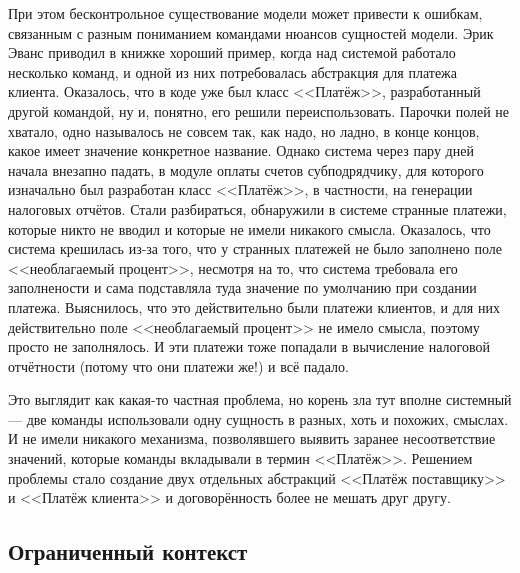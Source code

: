\documentclass{../../text-style}
\begin{document}
При этом бесконтрольное существование модели может привести к ошибкам, связанным с разным пониманием командами нюансов сущностей модели. Эрик Эванс приводил в книжке хороший пример, когда над системой работало несколько команд, и одной из них потребовалась абстракция для платежа клиента. Оказалось, что в коде уже был класс <<Платёж>>, разработанный другой командой, ну и, понятно, его решили переиспользовать. Парочки полей не хватало, одно называлось не совсем так, как надо, но ладно, в конце концов, какое имеет значение конкретное название. Однако система через пару дней начала внезапно падать, в модуле оплаты счетов субподрядчику, для которого изначально был разработан класс <<Платёж>>, в частности, на генерации налоговых отчётов. Стали разбираться, обнаружили в системе странные платежи, которые никто не вводил и которые не имели никакого смысла. Оказалось, что система крешилась из-за того, что у странных платежей не было заполнено поле <<необлагаемый процент>>, несмотря на то, что система требовала его заполнености и сама подставляла туда значение по умолчанию при создании платежа. Выяснилось, что это действительно были платежи клиентов, и для них действительно поле <<необлагаемый процент>> не имело смысла, поэтому просто не заполнялось. И эти платежи тоже попадали в вычисление налоговой отчётности (потому что они платежи же!) и всё падало.

Это выглядит как какая-то частная проблема, но корень зла тут вполне системный --- две команды использовали одну сущность в разных, хоть и похожих, смыслах. И не имели никакого механизма, позволявшего выявить заранее несоответствие значений, которые команды вкладывали в термин <<Платёж>>. Решением проблемы стало создание двух отдельных абстракций <<Платёж поставщику>> и <<Платёж клиента>> и договорённость более не мешать друг другу.

\subsection{Ограниченный контекст}
\end{document}
